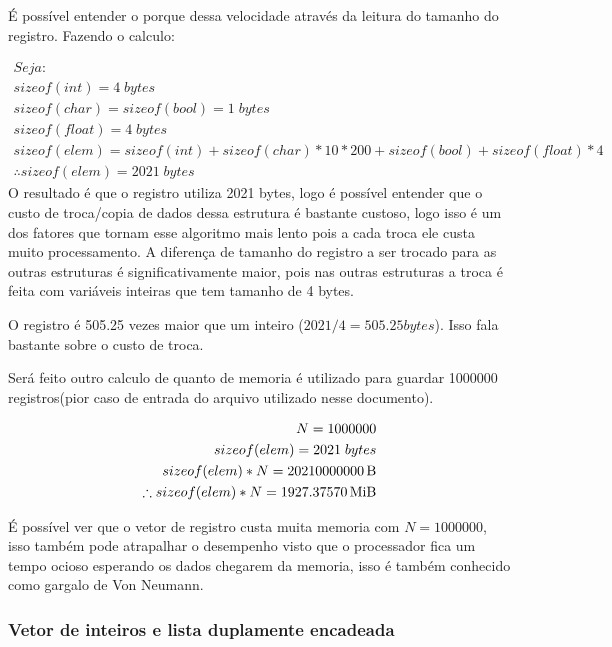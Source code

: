 \documentclass[11pt]{article}
\begin{document}
É possível entender o porque dessa velocidade através da leitura do tamanho do registro.
Fazendo o calculo: 

\begin{equation}
\begin{aligned}
Seja: \\
sizeof(int) = 4\; bytes\\
sizeof(char) = sizeof(bool) = 1\; bytes\\
sizeof(float) = 4\; bytes\\
sizeof(elem) = sizeof(int)+sizeof(char)*10*200+sizeof(bool)+sizeof(float)*4\\
\therefore sizeof(elem) = 2021\; bytes
\end{aligned}
\end{equation}
O resultado é que o registro utiliza 2021 bytes, logo é possível entender que o custo de troca/copia de dados dessa estrutura é bastante custoso, logo isso é um dos fatores que tornam esse algoritmo mais lento pois a cada troca ele custa muito processamento. A diferença de tamanho do registro a ser trocado para as outras estruturas é significativamente maior, pois nas outras estruturas a troca é feita com variáveis inteiras que tem tamanho de 4 bytes.

O registro é 505.25 vezes maior que um inteiro (\(2021/4 = 505.25 bytes\)). Isso fala bastante sobre o custo de troca.

Será feito outro calculo de quanto de memoria é utilizado para guardar 1000000 registros(pior caso de entrada do arquivo utilizado nesse documento).

\begin{equation}
\begin{aligned}
N = 1000000\\
sizeof(elem) = 2021\; bytes\\
sizeof(elem)*N = 2021000000 \SI{0}{\byte}\\
\therefore  sizeof(elem)*N = 1927.3757 \SI{0}{\mebi\byte}
\end{aligned}
\end{equation}

É possível ver que o vetor de registro custa muita memoria com \(N = 1000000\), isso também pode atrapalhar o desempenho visto que o processador fica um tempo ocioso esperando os dados chegarem da memoria, isso é também conhecido como gargalo de Von Neumann.

\subsubsection{Vetor de inteiros e lista duplamente encadeada}
\label{sec:org93ea938}
\end{document}
